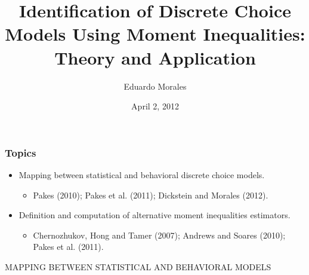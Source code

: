 \documentclass[10pt,letterpaper]{beamer}
\title[]{Identification of Discrete Choice Models Using Moment Inequalities:\\Theory and Application}
\author[Morales] {Eduardo Morales}
\institute[Columbia University & Princeton University]{Columbia University \& Princeton University}
\date[]{April 2, 2012}
\begin{document}
\begin{frame}[plain]
  \titlepage
\end{frame}
\begin{frame}
\frametitle{Topics}

\begin{itemize}
	\item Mapping between statistical and behavioral discrete choice models.
	\begin{itemize}
		\item Pakes (2010); Pakes et al. (2011); Dickstein and Morales (2012).
	\end{itemize}
	\item Definition and computation of alternative moment inequalities estimators.
	\begin{itemize}
		\item Chernozhukov, Hong and Tamer (2007); Andrews and Soares (2010); Pakes et al. (2011).
	\end{itemize}
\end{itemize}
\end{frame}
\begin{frame}
\centerline{MAPPING BETWEEN STATISTICAL AND BEHAVIORAL MODELS}
\end{frame}
\end{document}
